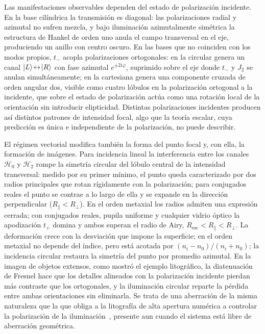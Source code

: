 Las manifestaciones observables dependen del estado de polarización
incidente. En la base cilíndrica la transmisión es diagonal: las
polarizaciones radial y azimutal no sufren mezcla, y bajo iluminación
azimutalmente simétrica la estructura de Hankel de orden uno anula el campo
transversal en el eje, produciendo un anillo con centro oscuro. En las bases
que no coinciden con los modos propios, $t_-$ acopla polarizaciones
ortogonales: en la circular genera un canal
$\ket{L}\!\leftrightarrow\!\ket{R}$ con fase azimutal $e^{\pm2i\varphi}$,
suprimido sobre el eje donde $t_-$ y $J_2$ se anulan simultáneamente; en la
cartesiana genera una componente cruzada de orden angular dos, visible como
cuatro lóbulos en la polarización ortogonal a la incidente, que sobre el
estado de polarización actúa como una rotación local de la orientación sin
introducir elipticidad. Distintas polarizaciones incidentes producen así
distintos patrones de intensidad focal, algo que la teoría escalar, cuya
predicción es única e independiente de la polarización, no puede describir.

El régimen vectorial modifica también la forma del punto focal y, con ella,
la formación de imágenes. Para incidencia lineal la interferencia entre los
canales $\mathscr H_0$ y $\mathscr H_2$ rompe la simetría circular del lóbulo
central de la intensidad transversal: medido por su primer mínimo, el punto
queda caracterizado por dos radios principales que rotan rígidamente con la
polarización; para conjugados reales el punto se contrae a lo largo de ella y
se expande en la dirección perpendicular ($R_\parallel<R_\perp$). En el orden metaxial los
radios admiten una expresión cerrada; con conjugados reales, pupila uniforme
y cualquier vidrio óptico la apodización $t_+$ domina y ambos superan el radio de Airy,
$R_{\mathrm{esc}}<R_\parallel<R_\perp$. La deformación crece con la
desviación que impone la superficie; en el orden metaxial no depende del
índice, pero está acotada por $(n_i-n_0)/(n_i+n_0)$; la incidencia circular restaura la
simetría del punto por promedio azimutal. En la imagen de objetos extensos,
como mostró el ejemplo litográfico, la diatenuación de Fresnel hace que los
detalles alineados con la polarización incidente pierdan más contraste que
los ortogonales, y la iluminación circular reparte la pérdida entre ambas
orientaciones sin eliminarla. Se trata de una aberración de la misma
naturaleza que la que obliga a la litografía de alta apertura numérica a
controlar la polarización de la iluminación~\cite{flagello1996, ruoff2009},
presente aun cuando el sistema está libre de aberración geométrica.

